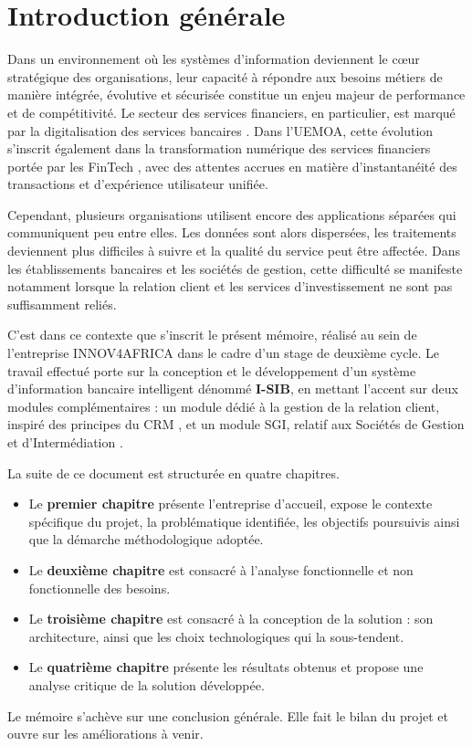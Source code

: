 \chapter*{Introduction générale}
{}

Dans un environnement où les systèmes d'information deviennent le cœur stratégique des organisations, leur capacité à répondre aux besoins métiers de manière intégrée, évolutive et sécurisée constitue un enjeu majeur de performance et de compétitivité. Le secteur des services financiers, en particulier, est marqué par la digitalisation des services bancaires \cite{vives_digital_banking}. Dans l'UEMOA, cette évolution s'inscrit également dans la transformation numérique des services financiers portée par les FinTech \cite{bceao_fintech}, avec des attentes accrues en matière d'instantanéité des transactions et d'expérience utilisateur unifiée.

Cependant, plusieurs organisations utilisent encore des applications séparées qui communiquent peu entre elles. Les données sont alors dispersées, les traitements deviennent plus difficiles à suivre et la qualité du service peut être affectée. Dans les établissements bancaires et les sociétés de gestion, cette difficulté se manifeste notamment lorsque la relation client et les services d'investissement ne sont pas suffisamment reliés.

C'est dans ce contexte que s'inscrit le présent mémoire, réalisé au sein de l'entreprise INNOV4AFRICA dans le cadre d'un stage de deuxième cycle. Le travail effectué porte sur la conception et le développement d'un système d'information bancaire intelligent dénommé \textbf{I-SIB}, en mettant l'accent sur deux modules complémentaires : un module dédié à la gestion de la relation client, inspiré des principes du CRM \cite{payne_frow_crm}, et un module SGI, relatif aux Sociétés de Gestion et d'Intermédiation \cite{crepmf_sgi}.



La suite de ce document est structurée en quatre chapitres.

\begin{itemize}
    \item Le \textbf{premier chapitre} présente l'entreprise d'accueil, expose le contexte spécifique du projet, la problématique identifiée, les objectifs poursuivis ainsi que la démarche méthodologique adoptée.
    \item Le \textbf{deuxième chapitre} est consacré à l'analyse fonctionnelle et non fonctionnelle des besoins.
    \item Le \textbf{troisième chapitre} est consacré à la conception de la solution : son architecture, ainsi que les choix technologiques qui la sous-tendent.
    \item Le \textbf{quatrième chapitre} présente les résultats obtenus et propose une analyse critique de la solution développée.
\end{itemize}

Le mémoire s'achève sur une conclusion générale. Elle fait le bilan du projet et ouvre sur les améliorations à venir.
